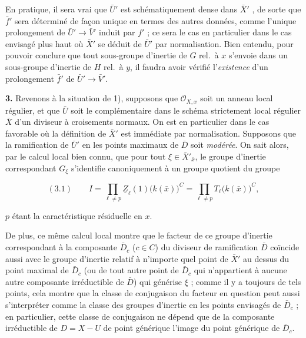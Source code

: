 \documentclass[11pt,a4paper]{article}
\begin{document}

En pratique, il sera vrai que $\bar{U}'$ est schématiquement dense dans
$\bar{X}'$ , de sorte que $\bar{f}'$
sera déterminé de façon unique en termes des autres données, comme l'unique
prolongement de $\bar{U}' \to \bar{V}'$ induit par $f'$ ; ce sera le cas en
particulier dans le cas envisagé plus haut où $\bar{X}'$ se déduit de
\struck{\ill{}} $\bar{U}'$ par normalisation. Bien entendu, pour pouvoir
conclure  que tout sous-groupe d'inertie de $G$ rel.\ à $x$ s'envoie
dans un sous-groupe d'inertie de $H$ rel.\ à $y$, il faudra avoir vérifié
l'\emph{existence} d'un prolongement $\bar{f}'$ de $\bar{U}' \to \bar{V}'$.


\textbf{3.} Revenons à la situation de 1), supposons que $\mathcal{O}_{X,x}$
soit un anneau local régulier, et que $\bar{U}$ soit le complémentaire dans le
schéma strictement local régulier $\bar{X}$ d'un diviseur  à
croisements normaux. On est en particulier dans le cas favorable où la
définition de $\bar{X}'$ est immédiate par normalisation. Supposons que la
ramification de $\bar{U}'$ en les points maximaux de $\bar{D}$ soit
\emph{modérée}. On sait alors, par le calcul local bien connu, que pour tout
$\xi \in \bar{X}'_{\bar{x}}$, le groupe d'inertie correspondant $G_{\xi}$
s'identifie canoniquement \struck{\ill{}} à un groupe quotient du groupe

\begin{equation*}
(3.1) \qquad I = \prod_{\ell \neq p} \underline{Z}_{\ell}(1)\big(k(\bar{x})
\big)^{C} = \prod_{\ell \neq p} T_{\ell}\big(k(\bar{x})\big)^{C},
\end{equation*}

$p$ étant la caractéristique résiduelle en $x$.


De plus, ce même calcul local montre que le facteur de ce groupe d'inertie
correspondant à la composante $\bar{D}_{c}$ ($c \in C$) du diviseur de
ramification $\bar{D}$ coïncide aussi avec le groupe d'inertie relatif à
n'importe quel point de $\bar{X}'$ au dessus du point maximal de $\bar{D}_{c}$
(ou de tout autre point de $\bar{D}_{c}$ qui n'appartient à aucune autre
composante irréductible de $\bar{D}$) qui générise $\xi$ ; comme il y a
toujours de tels points, cela montre que la classe de conjugaison du facteur en
question peut aussi s'interpréter comme la classe des groupes
d'inertie en les points envisagés de $\bar{D}_{c}$ ; en particulier, cette
classe de conjugaison ne dépend que de la composante irréductible de $D = X - U$
\struck{\ill{}} de point générique l'image du point générique de $\bar{D}_{c}$.
\end{document}
